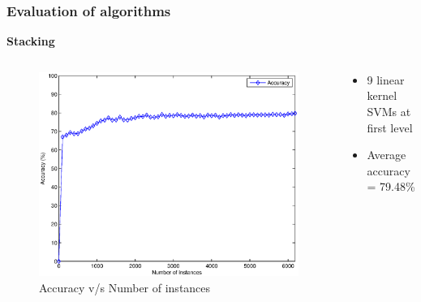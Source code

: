 \documentclass{beamer}
\begin{document}
    \begin{frame}
        \frametitle{Evaluation of algorithms}
        \begin{center}
            \textbf{Stacking}
        \end{center}
        \begin{columns}
            \begin{column}{0.5\textwidth}
                \begin{figure}
                    \centering
                    \includegraphics[width=\textwidth]{figures/stacking_accuracy.eps}
                    \caption{Accuracy v/s Number of instances}
                \end{figure}
            \end{column}
            \begin{column}{0.5\textwidth}
                \begin{itemize}
                    \item{9 linear kernel SVMs at first level}
                    \item{Average accuracy = 79.48\%}
                \end{itemize}
            \end{column}
        \end{columns}
    \end{frame}
    
\end{document}
